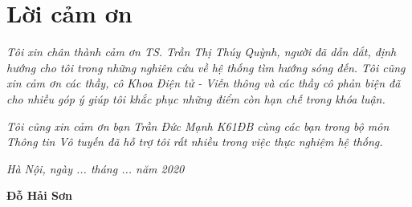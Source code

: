 \chapter*{Lời cảm ơn}

\textit{Tôi xin chân thành cảm ơn TS. Trần Thị Thúy Quỳnh, người đã dẫn dắt, định hướng cho tôi trong những nghiên cứu về hệ thống tìm hướng sóng đến. Tôi cũng xin cảm ơn các thầy, cô Khoa Điện tử - Viễn thông và các thầy cô phản biện đã cho nhiều góp ý giúp tôi khắc phục những điểm còn hạn chế trong khóa luận.}

\textit{Tôi cũng xin cảm ơn bạn Trần Đức Mạnh K61ĐB cùng các bạn trong bộ môn Thông tin Vô tuyến đã hỗ trợ tôi rất nhiều trong việc thực nghiệm hệ thống.}

\vspace{1cm}
\hspace{7cm}\textit{Hà Nội, ngày ... tháng ... năm 2020}
\vspace{1.5cm}

\hspace{9.3cm}\textbf{Đỗ Hải Sơn}

